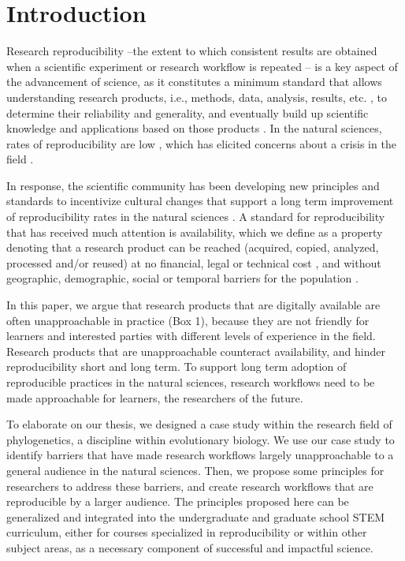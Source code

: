 \documentclass[12pt]{article}
\begin{document}
\newpage
{} %
\section*{Introduction}
\label{sec:intro}

Research reproducibility --the extent to which consistent results are obtained when
a scientific experiment or research workflow is repeated \citep{repdef2021}--
is a key aspect of the advancement
of science, as it constitutes a minimum standard that allows understanding research products,
i.e., methods, data, analysis, results, etc. \citep{piwowar2013value},
to determine their reliability and generality, and eventually build up scientific
knowledge and applications based on those products
\citep{king1995replication, peng2011reproducible, powers2019open}.
In the natural sciences, rates of reproducibility are low \citep{ioannidis2005most, prinz2011believe},
which has elicited concerns about a crisis in the field \citep{baker2016reproducibility}.

In response, the scientific community has been developing new principles and standards to incentivize
cultural changes that support a long term improvement of reproducibility rates in the natural sciences
\citep{peng2015reproducibility, wilkinson2016fair, miyakawa2020no}.
A standard for reproducibility that has received much attention is availability, which
we define as a property denoting that a research product can be reached (acquired, copied, analyzed,
processed and/or reused) at no financial, legal or technical cost \citep{arnold2019turing},
and without geographic, demographic, social or temporal barriers for the population \citep{fecher2014open}.

In this paper, we argue that research products that are digitally available are
often unapproachable in practice (Box 1), because they are not
friendly for learners and interested parties with different levels of
experience in the field. Research products that are unapproachable
counteract availability, and hinder reproducibility short and long term.
To support long term adoption of reproducible practices in the natural sciences, research
workflows need to be made approachable for learners, the researchers of the future.

To elaborate on our thesis, we designed a case study within the research field of
phylogenetics, a discipline within evolutionary biology.
We use our case study to identify barriers that have made research workflows
largely unapproachable to a general audience in the natural sciences.
Then, we propose some principles for researchers to address these barriers, and
create research workflows that are reproducible by a larger audience.
The principles proposed here can be generalized and integrated into the undergraduate
and graduate school STEM curriculum, either for courses specialized in reproducibility
or within other subject areas, as a necessary component of successful and impactful science.
\end{document}
